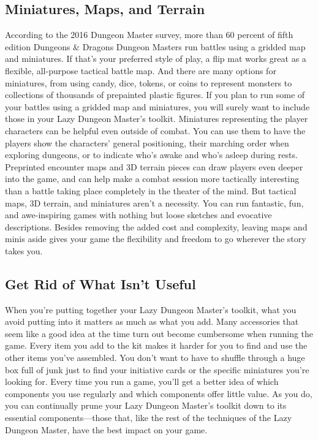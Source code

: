 \documentclass[10pt,a4paper,twoside,bg=print,twocolumn,openany,nodeprecatedcode]{dndbook}
\begin{document}
\subsection{Miniatures, Maps, and Terrain}
According to the 2016 Dungeon Master survey, more than 60 percent of fifth edition Dungeons \& Dragons Dungeon Masters run battles using a gridded map and miniatures. If that's your preferred style of play, a flip mat works great as a flexible, all-purpose tactical battle map. And there are many options for miniatures, from using candy, dice, tokens, or coins to represent monsters to collections of thousands of prepainted plastic figures. If you plan to run some of your battles using a gridded map and miniatures, you will surely want to include those in your Lazy Dungeon Master's toolkit.
Miniatures representing the player characters can be helpful even outside of combat. You can use them to have the players show the characters' general positioning, their marching order when exploring dungeons, or to indicate who's awake and who's asleep during rests.
Preprinted encounter maps and 3D terrain pieces can draw players even deeper into the game, and can help make a combat session more tactically interesting than a battle taking place completely in the theater of the mind. But tactical maps, 3D terrain, and miniatures aren't a necessity. You can run fantastic, fun, and awe-inspiring games with nothing but loose sketches and evocative descriptions. Besides removing the added cost and complexity, leaving maps and minis aside gives your game the flexibility and freedom to go wherever the story takes you.
\subsection{Get Rid of What Isn't Useful}
When you're putting together your Lazy Dungeon Master's toolkit, what you avoid putting into it matters as much as what you add. Many accessories that seem like a good idea at the time turn out become cumbersome when running the game. Every item you add to the kit makes it harder for you to find and use the other items you've assembled. You don't want to have to shuffle through a huge box full of junk just to find your initiative cards or the specific miniatures you're looking for.
Every time you run a game, you'll get a better idea of which components you use regularly and which components offer little value. As you do, you can continually prune your Lazy Dungeon Master's toolkit down to its essential components—those that, like the rest of the techniques of the Lazy Dungeon Master, have the best impact on your game.
\end{document}
